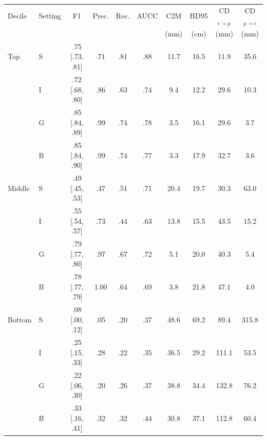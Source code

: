 \begin{tabular}{@{}llcccccccc@{}}
\toprule
Decile & Setting & F1 & Prec. & Rec. & AUCC & C2M & HD95 & CD$_{\mathrm{r}\to\mathrm{p}}$ & CD$_{\mathrm{p}\to\mathrm{r}}$ \\
 & & & & & & (mm) & (cm) & (mm) & (mm) \\
\midrule
Top & S & .75 [.73, .81] & .71 & .81 & .88 & 11.7 & 16.5 & 11.9 & 35.6 \\
 & I & .72 [.68, .80] & .86 & .63 & .74 & 9.4 & 12.2 & 29.6 & 10.3 \\
 & G & .85 [.84, .89] & .99 & .74 & .78 & 3.5 & 16.1 & 29.6 & 3.7 \\
 & B & .85 [.84, .90] & .99 & .74 & .77 & 3.3 & 17.9 & 32.7 & 3.6 \\
\midrule
Middle & S & .49 [.45, .53] & .47 & .51 & .71 & 20.4 & 19.7 & 30.3 & 63.0 \\
 & I & .55 [.54, .57] & .73 & .44 & .63 & 13.8 & 15.5 & 43.5 & 15.2 \\
 & G & .79 [.77, .80] & .97 & .67 & .72 & 5.1 & 20.0 & 40.3 & 5.4 \\
 & B & .78 [.77, .79] & 1.00 & .64 & .69 & 3.8 & 21.8 & 47.1 & 4.0 \\
\midrule
Bottom & S & .08 [.00, .12] & .05 & .20 & .37 & 48.6 & 69.2 & 89.4 & 315.8 \\
 & I & .25 [.15, .33] & .28 & .22 & .35 & 36.5 & 29.2 & 111.1 & 53.5 \\
 & G & .22 [.06, .30] & .20 & .26 & .37 & 38.8 & 34.4 & 132.8 & 76.2 \\
 & B & .33 [.16, .41] & .32 & .32 & .44 & 30.8 & 37.1 & 112.8 & 60.4 \\
\bottomrule
\end{tabular}
